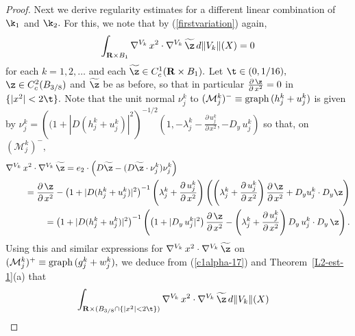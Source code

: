 \documentclass[a4paper,11pt]{amsart}
\begin{document}
\begin{proof}
Next we derive regularity estimates for a different linear combination of $\k_{1}$ and $\k_{2}.$ For this, we note 
that by (\ref{firstvariation}) again, 
\begin{equation}\label{c1alpha-17}
\int_{{\mathbf R} \times B_{1}} \nabla^{V_{k}} \, x^{2} \cdot \nabla^{V_{k}} \, \widetilde{\z} \, d\|V_{k}\|(X) = 0
\end{equation}
for each $k=1, 2, \ldots$ and each $\widetilde{\z} \in C^{1}_{c}({\mathbf R} \times B_{1}).$ Let $\t \in (0, 1/16),$  
$\z \in C^{2}_{c}(B_{3/8})$ and $\widetilde{\z}$ be as before, so that in particular $\frac{\partial \, \z}{\partial \, x^{2}} = 0$ in $\{|x^{2}| < 2\t\}.$ Note that the unit normal $\nu_{j}^{k}$ to $(\mathcal{M}_{j}^{k})^{-} \equiv {\rm graph} \, (h_{j}^{k} + u_{j}^{k})$  is given by 
$\nu_{j}^{k} = \left((1 + |D(h_{j}^{k} + u_{j}^{k})|^{2}\right)^{-1/2}\left(1, -\lambda_{j}^{k} -\frac{\partial \, u_{j}^{k}}{\partial \, x^{2}}, -D_{y} \, u_{j}^{k}\right)$ so that, on $(\mathcal{M}_{j}^{k})^{-},$
\begin{eqnarray*}
\nabla^{V_{k}} \, x^{2} \cdot \nabla^{V_{k}} \, \widetilde{\z}  = e_{2} \cdot\left(D\widetilde{\z} - 
(D\widetilde{\z} \cdot \nu_{j}^{k})\nu_{j}^{k}\right)&&\nonumber\\
 &&\hspace{-2.5in}= \frac{\partial \, \z}{\partial \, x^{2}} - \left( 1 + |D(h_{j}^{k} + u_{j}^{k})|^{2}\right)^{-1}\left(\lambda_{j}^{k} + \frac{\partial \, u_{j}^{k}}{\partial \, x^{2}}\right)\left(\left(\lambda_{j}^{k} + \frac{\partial \, u_{j}^{k}}{\partial \, x^{2}}\right)\frac{\partial \, \z}{\partial \, x^{2}} + D_{y}u_{j}^{k} \cdot D_{y} \z\right)\nonumber\\
&&\hspace{-2.5in}= \left( 1 + |D(h_{j}^{k} + u_{j}^{k})|^{2}\right)^{-1}
\left(\left(1 + |D_{y} \, u_{j}^{k}|^{2}\right) \frac{\partial \, \z}{\partial \, x^{2}} - \left(\lambda_{j}^{k} + \frac{\partial \, u_{j}^{k}}{\partial \, x^{2}}\right)D_{y} \, u_{j}^{k} \cdot D_{y} \, \z\right). 
\end{eqnarray*}
Using this and similar expressions for $\nabla^{V_{k}} \, x^{2} \cdot \nabla^{V_{k}} \, \widetilde{\z}$ on $(\mathcal{M}_{j}^{k})^{+} \equiv {\rm graph} \, (g_{j}^{k} + w_{j}^{k}),$ we deduce from (\ref{c1alpha-17}) and
Theorem~\ref{L2-est-1}(a) that 
\begin{eqnarray}\label{c1alpha-18}
\int_{{\mathbf R} \times (B_{3/8} \cap \{|x^{2}| < 2\t\})} \nabla^{V_{k}} \, x^{2} \cdot \nabla^{V_{k}} \, \widetilde{\z} \, d\|V_{k}\|(X)&&\nonumber\\ 

\end{eqnarray}
\end{proof}
\end{document}
